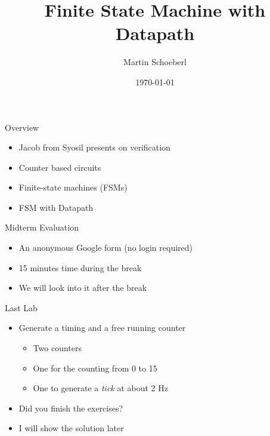 

\newif\ifbook


\title{Finite State Machine with Datapath}
\author{Martin Schoeberl}
\date{\today}



\begin{frame}
\titlepage
\end{frame}

\begin{frame}[fragile]{Overview}
\begin{itemize}
\item Jacob from Syosil presents on verification
\item Counter based circuits
\item Finite-state machines (FSMs) 
\item FSM with Datapath
\end{itemize}
\end{frame}

\begin{frame}[fragile]{Midterm Evaluation}
\begin{itemize}
\item An anonymous Google form (no login required)
\item 15 minutes time during the break
\item We will look into it after the break
\end{itemize}
\end{frame}

\begin{frame}[fragile]{Last Lab}
\begin{itemize}
\item Generate a timing and a free running counter
\begin{itemize}
\item Two counters
\item One for the counting from 0 to 15
\item One to generate a \emph{tick} at about 2 Hz
\end{itemize}
\item Did you finish the exercises?
\item I will show the solution later
\end{itemize}
\end{frame}

